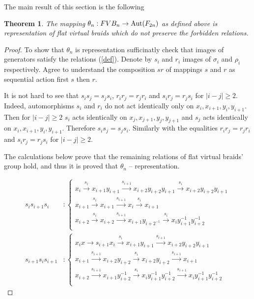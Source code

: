 \documentclass{article}
\newtheorem{theorem}{Theorem}
\begin{document}
The main result of this section is the following

\begin{theorem}
The mapping $\theta_n:FVB_n \rightarrow {\rm Aut}(F_{2n})$ as defined above is representation of flat virtual braids which do not preserve the forbidden relations.
\end{theorem} 

\begin{proof}
To show that $\theta_n$ is representation sufficinatly check that images of generators satisfy the relations (\ref{def}). Denote by $s_i$ and $r_i$ images of $\sigma_i$ and $\rho_i$ respectively. Agree to understand the composition $sr$ of mappings $s$ and $r$ as sequential action first $s$ then $r$.

It is not hard to see that $s_is_j=s_js_i$, $r_ir_j=r_jr_i$ and $s_ir_j=r_js_i$ for $|i-j|\ge2$. Indeed, automorphisms $s_i$ and $r_i$ do not act identically only on $x_i, x_{i+1}, y_i, y_{i+1}$. Then for $|i-j|\ge2$  $s_i$ acts identically on  $x_j, x_{j+1}, y_j, y_{j+1}$ and $s_j$ acts identically on  $x_i, x_{i+1}, y_i, y_{i+1}$. Therefore $s_is_j=s_js_i$. Similarly with the equalities $r_ir_j=r_jr_i$ and $s_ir_j=r_js_i$ for $|i-j|\ge2$.

The calculations below prove that the remaining relations of flat virtual braids' group hold, and thus it is proved that $\theta_n$ -- representation.

\begin{align*}
s_is_{i+1}s_i &:
\begin{cases}
x_i\xrightarrow{s_i} x_{i+1}y_{i+1}\xrightarrow{s_{i+1}} x_{i+2}y_{i+2}y_{i+1}\xrightarrow{s_i}x_{i+2}y_{i+2}y_{i+1}\\
x_{i+1}\xrightarrow{s_i} x_{i+1}\xrightarrow{s_{i+1}} x_i\xrightarrow{s_{i}} x_{i+1}\\
x_{i+2}\xrightarrow{s_i} x_{i+2}\xrightarrow{s_{i+1}} x_{i+1}y_{i+2^{-1}}\xrightarrow{s_i} x_iy_{i+1}^{-1}y_{i+2}^{-1}\\
\end{cases} \\
s_{i+1}s_is_{i+1} &:
\begin{cases}
x_ix\rightarrow{s_{i+1}} x_i\xrightarrow{s_i} x_{i+1}y_{i+1}\xrightarrow{s_{i+1}} x_{i+2}y_{i+2}y_{i+1}\\
x_{i+1}\xrightarrow{s_{i+1}} x_{i+2}y_{i+2}\xrightarrow{s_i} x_{i+2}y_{i+2}\xrightarrow{s_{i+1}} x_{i+1}\\
x_{i+2}\xrightarrow{s_{i+1}} x_{i+1}y_{i+2}^{-1}\xrightarrow{s_{i}} x_iy_{i+1}^{-1}y_{i+2}^{-1}\xrightarrow{s_{i+1}} x_iy_{i+1}^{-1}y_{i+2}^{-1}\\
\end{cases} 
\end{align*}


\end{proof}
\end{document}

